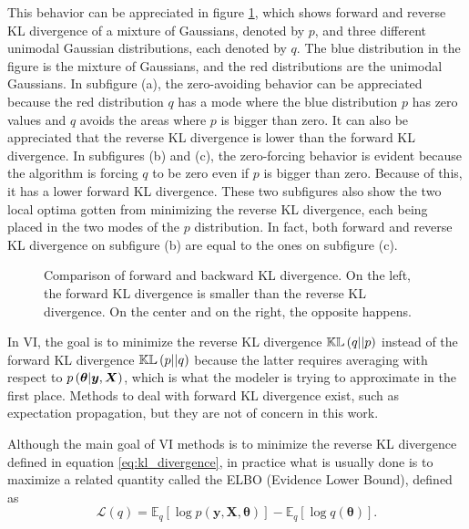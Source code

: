 This behavior can be appreciated in figure \ref{fig:KL_example}, which shows forward and reverse KL divergence of a mixture of Gaussians, denoted by $p$, and three different unimodal Gaussian distributions, each denoted by $q$. The blue distribution in the figure is the mixture of Gaussians, and the red distributions are the unimodal Gaussians.
In subfigure (a), the zero-avoiding behavior can be appreciated because the red distribution $q$ has a mode where the blue distribution $p$ has zero values and $q$ avoids the areas where $p$ is bigger than zero. It can also be appreciated that the reverse KL divergence is lower than the forward KL divergence.
In subfigures (b) and (c), the zero-forcing behavior is evident because the algorithm is forcing $q$ to be zero even if $p$ is bigger than zero. Because of this, it has a lower forward KL divergence. These two subfigures also show the two local optima gotten from minimizing the reverse KL divergence, each being placed in the two modes of the $p$ distribution. In fact, both forward and reverse KL divergence on subfigure (b) are equal to the ones on subfigure (c).

\begin{figure}[H]
  \centering
  \hfill
  \hfill
  \caption{Comparison of forward and backward KL divergence. On the left, the forward KL divergence is smaller than the reverse KL divergence. On the center and on the right, the opposite happens.}
  \label{fig:KL_example}
\end{figure}

In VI, the goal is to minimize the reverse KL divergence $\mathbb{KL}\left( q || p \right)$ instead of the forward KL divergence $\mathbb{KL}\left( p || q \right)$ because the latter requires averaging with respect to $p\left( \boldsymbol{\theta} | \boldsymbol{y}, \boldsymbol{X} \right)$, which is what the modeler is trying to approximate in the first place. Methods to deal with forward KL divergence exist, such as expectation propagation, but they are not of concern in this work.

Although the main goal of VI methods is to minimize the reverse KL divergence defined in equation \eqref{eq:kl_divergence}, in practice what is usually done is to maximize a related quantity called the ELBO (Evidence Lower Bound), defined as
\begin{equation}
  \label{eq:elbo_def}
  \mathcal{L}(q) = \mathbb{E}_q\left[ \log p(\boldsymbol{y}, \boldsymbol{X}, \boldsymbol{\theta}) \right] - \mathbb{E}_q\left[ \log q(\boldsymbol{\theta}) \right].
\end{equation}

